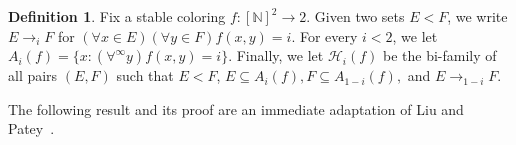 \documentclass{article}
\def\Hc{\mathcal{H}}
\newcommand{\NN}[0]{\mathbb{N}}
\def\NN{\mathbb{N}}
\def\Hc{\mathcal{H}}
\newtheorem{theorem}{Theorem}
\numberwithin{theorem}{section}
\theoremstyle{definition}
\newtheorem{definition}[theorem]{Definition}
\begin{document}
\begin{definition}
Fix a stable coloring $f : [\NN]^2 \to 2$. Given two sets $E < F$, we write $E \to_i F$ for $(\forall x \in E)(\forall y \in  F)f(x, y) = i$. For every $i < 2$, we let $A_i(f) = \{x : (\forall^\infty y)f(x, y) = i\}$. Finally, we let $\Hc_i(f)$ be the bi-family of all pairs $(E, F)$ such that $E < F$, $E \subseteq A_i(f), F \subseteq A_{1-i}(f), $ and $E \to_{1-i} F$. 
\end{definition}

The following result and its proof are an immediate adaptation of Liu and Patey~\cite[Proposition 2.10]{liu2022reverse}.

    
\end{document}
